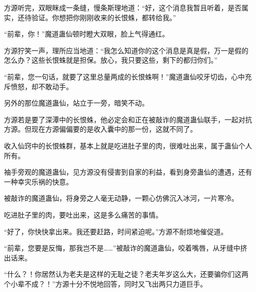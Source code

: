 \begin{this_body}
方源听完，双眼眯成一条缝，慢条斯理地道：“好，这个消息我暂且听着，是否属实，还待验证。你想把你刚刚收来的长恨蛛，都转给我。”

“前辈，你！”魔道蛊仙顿时瞪大双眼，脸上气得通红。

方源狞笑一声，理所应当地道：“我怎么知道你的这个消息是真是假，万一是假的怎么办？这些长恨蛛就是担保。放心，我只要这些，剩下的都归你们。”

“前辈，您一句话，就要了这里总量两成的长恨蛛啊！”魔道蛊仙咬牙切齿，心中充斥愤怒，却不敢动手。

另外的那位魔道蛊仙，站立于一旁，暗笑不动。

方源若是要了深潭中的长恨蛛，他必定会和正在被敲诈的魔道蛊仙联手，一起对抗方源。但现在方源偏偏要的是收入囊中的那一份，这就不同了。

收入仙窍中的长恨蛛群，基本上就是吃进肚子里的肉，很难吐出来，属于蛊仙个人所有。

袖手旁观的魔道蛊仙，见方源没有侵害到自家的利益，看到身旁蛊仙的遭遇，还有一种幸灾乐祸的快意。

被敲诈的魔道蛊仙，将身旁之人毫无动静，一颗心仿佛沉入冰河，一片寒冷。

吃进肚子里的肉，要吐出来，这是多么痛苦的事情。

“好了，你快快拿出来。我还要赶路，时间紧迫呢。”方源不耐烦地催促道。

“前辈，您要是反悔，那我岂不是……”被敲诈的魔道蛊仙，咬着嘴唇，从牙缝中挤出话来。

“什么？！你居然认为老夫是这样的无耻之徒？老夫年岁这么大，还要骗你们这两个小辈不成？！”方源十分不悦地回答，同时又飞出两只力道巨手。

\end{this_body}

